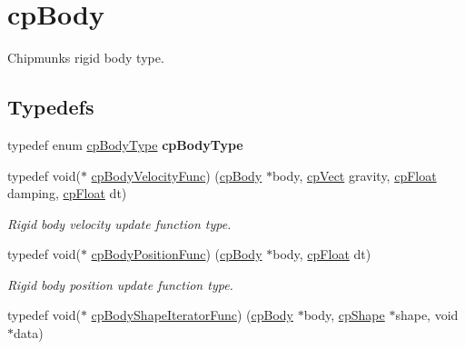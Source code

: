 \hypertarget{group__cp_body}{}\section{cp\+Body}
\label{group__cp_body}


Chipmunk\textquotesingle{}s rigid body type.  


\subsection*{Typedefs}
\begin{DoxyCompactItemize}
\item 
\hypertarget{group__cp_body_ga45565578b1dfe055f40930f24506807a}{}typedef enum \hyperlink{group__cp_body_ga3581b128fd3e2734952aeac8545fd5ca}{cp\+Body\+Type} {\bfseries cp\+Body\+Type}\label{group__cp_body_ga45565578b1dfe055f40930f24506807a}

\item 
\hypertarget{group__cp_body_gaa7a1f4706fb8e879c356ae99035ead71}{}typedef void($\ast$ \hyperlink{group__cp_body_gaa7a1f4706fb8e879c356ae99035ead71}{cp\+Body\+Velocity\+Func}) (\hyperlink{structcp_body}{cp\+Body} $\ast$body, \hyperlink{structcp_vect}{cp\+Vect} gravity, \hyperlink{group__basic_types_gac1ed65573e035bf892505768c852d8d3}{cp\+Float} damping, \hyperlink{group__basic_types_gac1ed65573e035bf892505768c852d8d3}{cp\+Float} dt)\label{group__cp_body_gaa7a1f4706fb8e879c356ae99035ead71}

\begin{DoxyCompactList}\small\item\em Rigid body velocity update function type. \end{DoxyCompactList}\item 
\hypertarget{group__cp_body_ga3386e3b0b4156289ab6099cc64c952e7}{}typedef void($\ast$ \hyperlink{group__cp_body_ga3386e3b0b4156289ab6099cc64c952e7}{cp\+Body\+Position\+Func}) (\hyperlink{structcp_body}{cp\+Body} $\ast$body, \hyperlink{group__basic_types_gac1ed65573e035bf892505768c852d8d3}{cp\+Float} dt)\label{group__cp_body_ga3386e3b0b4156289ab6099cc64c952e7}

\begin{DoxyCompactList}\small\item\em Rigid body position update function type. \end{DoxyCompactList}\item 
\hypertarget{group__cp_body_gacc4f466cbeaa87fc8b05c0357e1e316d}{}typedef void($\ast$ \hyperlink{group__cp_body_gacc4f466cbeaa87fc8b05c0357e1e316d}{cp\+Body\+Shape\+Iterator\+Func}) (\hyperlink{structcp_body}{cp\+Body} $\ast$body, \hyperlink{structcp_shape}{cp\+Shape} $\ast$shape, void $\ast$data)\label{group__cp_body_gacc4f466cbeaa87fc8b05c0357e1e316d}


\end{DoxyCompactItemize}
